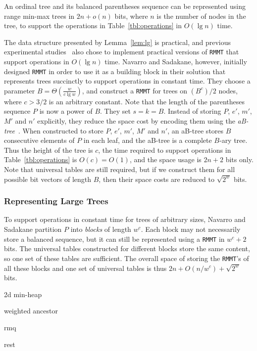 \begin{lemma}\label{lem:lg}
An ordinal tree and its balanced parentheses sequence can be represented using range min-max trees in $2n + o(n)$ bits, where $n$ is the number of nodes in the tree, to support the operations in Table~\ref{tbl:operations} in $O(\lg n)$ time. 
\end{lemma}

The data structure presented by Lemma~\ref{lem:lg} is practical, and previous experimental studies~\cite{ACNSalenex10} also chose to implement practical versions of {\tt RMMT} that support operations in $O(\lg n)$ time. 
Navarro and Sadakane, however, initially designed {\tt RMMT} in order to use it as a building block in their solution that represents trees succinctly to support operations in constant time. 
They choose a parameter $B = \Theta(\frac{w}{c\lg w})$, and construct a {\tt RMMT} for trees on $(B^c)/2$ nodes, where $c > 3/2$ is an arbitrary constant. 
Note that the length of the parentheses sequence $P$ is now a power of $B$. 
They set $s = k = B$. 
Instead of storing $P$, $e'$, $m'$, $M'$ and $n'$ explicitly, they reduce the space cost by encoding them using the {\em aB-tree}~\cite{Patrascu:2008:SUC:1470582.1470670}. 
When constructed to store $P$, $e'$, $m'$, $M'$ and $n'$, an aB-tree stores $B$ consecutive elements of $P$ in each leaf, and the aB-tree is a complete $B$-ary tree. 
Thus the height of the tree is $c$, the time required to support operations in Table~\ref{tbl:operations} is $O(c) = O(1)$, and the space usage is $2n+2$ bits only. 
Note that universal tables are still required, but if we construct them for all possible bit vectors of length $B$, then their space costs are reduced to $\sqrt{2^w}$ bits. 

\subsubsection{Representing Large Trees}

To support operations in constant time for trees of arbitrary sizes, Navarro and Sadakane partition $P$ into {\em blocks} of length $w^c$. 
Each block may not necessarily store a balanced sequence, but it can still be represented using a {\tt RMMT} in $w^c + 2$ bits.  
The universal tables constructed for different blocks store the same content, so one set of these tables are sufficient. 
The overall space of storing the {\tt RMMT}'s of all these blocks and one set of universal tables is thus $2n + O(n/w^c) + \sqrt{2^w}$ bits. 

2d min-heap

weighted ancestor

rmq

rest